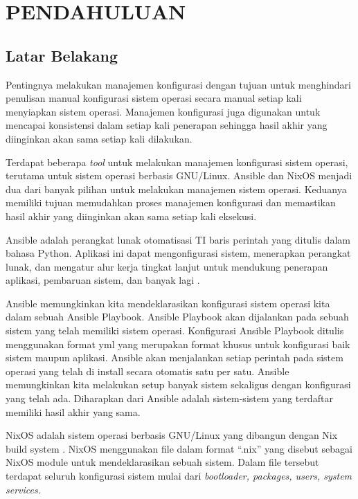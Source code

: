 \documentclass[10pt,]{report}
\begin{document}
\chapter{PENDAHULUAN}
\section{Latar Belakang}
\begin{adjustwidth}{0.70cm}{}
	\vspace{-3mm}
	\hspace\parindent
	Pentingnya melakukan manajemen konfigurasi dengan tujuan untuk menghindari
	penulisan manual konfigurasi sistem operasi secara manual setiap kali
	menyiapkan sistem operasi. Manajemen konfigurasi juga digunakan untuk
	mencapai konsistensi dalam setiap kali penerapan sehingga hasil akhir yang
	diinginkan akan sama setiap kali dilakukan.

	Terdapat beberapa \textit{tool} untuk melakukan manajemen konfigurasi sistem operasi,
	terutama untuk sistem operasi berbasis GNU/Linux. Ansible dan NixOS menjadi
	dua dari banyak pilihan untuk melakukan manajemen sistem operasi. Keduanya
	memiliki tujuan memudahkan proses manajemen konfigurasi dan memastikan hasil
	akhir yang diinginkan akan sama setiap kali eksekusi.

	Ansible adalah perangkat lunak otomatisasi TI baris perintah yang ditulis
	dalam bahasa Python. Aplikasi ini dapat mengonfigurasi sistem, menerapkan
	perangkat lunak, dan mengatur alur kerja tingkat lanjut untuk mendukung
	penerapan aplikasi, pembaruan sistem, dan banyak lagi \parencite{AnsibleRedHat}.

	Ansible memungkinkan kita mendeklarasikan konfigurasi sistem operasi kita dalam
	sebuah Ansible Playbook. Ansible Playbook akan dijalankan pada sebuah sistem
	yang telah memiliki sistem operasi. Konfigurasi Ansible Playbook ditulis
	menggunakan format yml yang merupakan format khusus untuk konfigurasi baik
	sistem maupun aplikasi. Ansible akan menjalankan setiap perintah pada sistem
	operasi yang telah di install secara otomatis satu per satu. Ansible
	memungkinkan kita melakukan setup banyak sistem sekaligus dengan konfigurasi
	yang telah ada. Diharapkan dari Ansible adalah sistem-sistem yang terdaftar
	memiliki hasil akhir yang sama.

	NixOS adalah sistem operasi berbasis GNU/Linux yang dibangun dengan Nix build
	system \parencite{hownixworks} . NixOS menggunakan file dalam format “.nix”
	yang disebut sebagai NixOS module untuk mendeklarasikan sebuah sistem. Dalam
	file tersebut terdapat seluruh konfigurasi sistem mulai dari
	\textit{bootloader, packages, users, system services.}


\end{adjustwidth}
\end{document}
